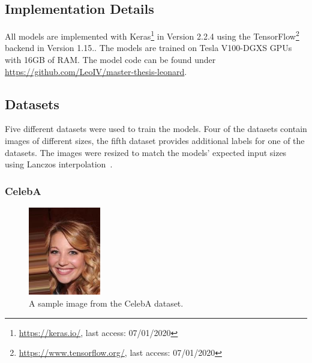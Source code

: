 \subsection{Implementation Details}\label{subsec:implementation-details}

All models are implemented with Keras\footnote{\href{https://keras.io/}{https://keras.io/}, last access: 07/01/2020} in Version 2.2.4 using the TensorFlow\footnote{\href{https://www.tensorflow.org/}{https://www.tensorflow.org/}, last access: 07/01/2020} backend in Version 1.15..
The models are trained on Tesla V100-DGXS GPUs with 16GB of RAM.
The model code can be found under \href{https://github.com/LeoIV/master-thesis-leonard}{https://github.com/LeoIV/master-thesis-leonard}.

\subsection{Datasets}\label{subsec:datasets}

Five different datasets were used to train the models.
Four of the datasets contain images of different sizes, the fifth dataset provides additional labels for one of the datasets.
The images were resized to match the models' expected input sizes using Lanczos interpolation~\citep[pp. 223, ff]{burger2009principles}.

\subsubsection{CelebA}\label{subsubsec:celeba_dataset}

\begin{figure}
    \begin{center}
        \includegraphics[width=0.28\textwidth]{images/celeba_sample_63.jpg}
    \end{center}
    \caption[CelebA dataset sample image]{A sample image from the CelebA dataset.}
    \label{fig:celeba_sample}
\end{figure}

